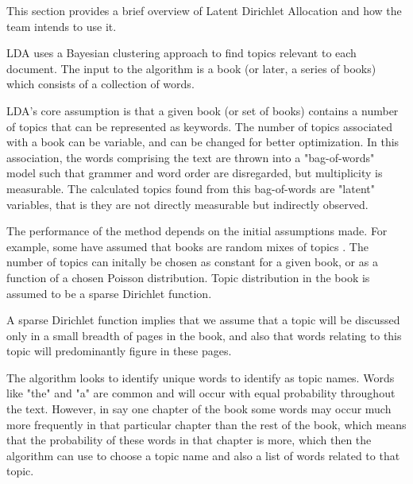 
This section provides a brief overview of Latent Dirichlet Allocation and
how the team intends to use it.

LDA uses a Bayesian clustering approach to find topics relevant
to each document. \cite{RefWorks:doc:5a721fb5e4b0d609eec83aa1} The input to
the algorithm is a book (or later, a series of books) which consists of
a collection of words. 

LDA's core assumption is that a given book (or set of books) contains
a number of topics that can be represented as keywords.  
The number of topics associated with a book can be variable, and
can be changed for better optimization.
In this association, the words comprising the text are thrown into a
"bag-of-words" model such that grammer and word order are disregarded,
but multiplicity is measurable.
The calculated topics found from this bag-of-words are
"latent" variables, that is they are not directly measurable but
indirectly observed.  

The performance of the method depends on the initial assumptions
made. For example, some have assumed that books are random mixes of
topics \cite{RefWorks:doc:5a721e4ae4b095066af57410}.
The number of topics can initally be chosen as constant for a given
book, or as a function of a chosen Poisson
distribution. \cite{RefWorks:doc:5a721e4ae4b095066af57410} Topic
distribution in the book is assumed to be a sparse Dirichlet function.

A sparse Dirichlet function implies that we assume that a topic will
be discussed only in a small breadth of pages in the book, and also
that words relating to this topic will predominantly figure in these pages.

The algorithm looks to identify unique words to identify as topic
names.
Words like "the" and "a" are common and will occur with equal
probability throughout the text.
However, in say one chapter of the book some words may occur much more
frequently in that particular chapter than the rest of the book, which means that the probability of
these words in that chapter is more, which then the algorithm can use
to choose a topic name and also a list of words related to that topic.
